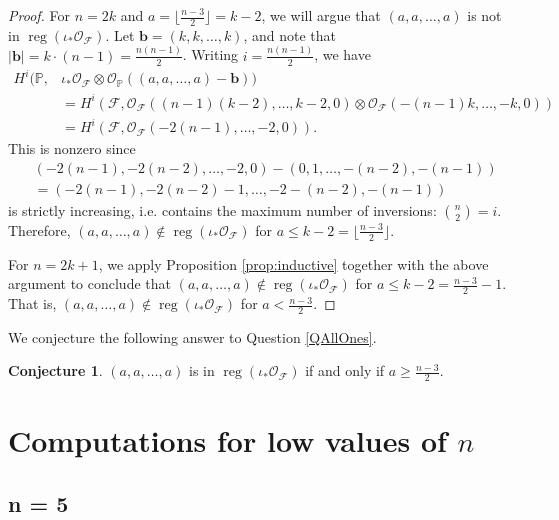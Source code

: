 \documentclass[12pt,reqno]{amsart}
\theoremstyle{definition}
\newtheorem{conj}[theorem]{Conjecture}
\theoremstyle{remark}
\newcommand{\reg}{\operatorname{reg}}
\newcommand{\calF}{{\mathcal{F}}}
\newcommand{\calO}{{\mathcal{O}}}
\begin{document}
\begin{proof}
    For $n = 2k$ and $a = \lfloor\frac{n-3}{2}\rfloor  = k-2$, we will argue that $(a,a,\ldots,a)$ is not in $\reg(\iota_*\calO_{\calF})$.  Let $\mathbf{b} = (k,k,\ldots,k)$, and note that $\lvert\mathbf{b}\rvert = k\cdot (n-1) = \frac{n(n-1)}{2}$.  Writing $i = \frac{n(n-1)}{2}$, we have
    \begin{align*}
        H^i(\mathbb P,&\iota_*\calO_{\calF}\otimes \calO_{\mathbb P}((a,a,\ldots,a)-\mathbf b)) \\
        &= H^i(\calF,\calO_{\calF}((n-1)(k-2),\ldots,k-2,0)\otimes\calO_{\calF}(-(n-1)k,\ldots,-k,0))\\
        &= H^i(\calF,\calO_{\calF}(-2(n-1),\ldots,-2,0)).
    \end{align*}
    This is nonzero since
    \begin{align*}
        &(-2(n-1),-2(n-2),\ldots,-2,0) - (0,1,\ldots,-(n-2),-(n-1))\\
        &= (-2(n-1),-2(n-2)-1,\ldots,-2-(n-2),-(n-1))
    \end{align*}
    is strictly increasing, i.e. contains the maximum number of inversions: $\binom{n}{2} = i$.  Therefore, $(a,a,\ldots,a) \notin \reg(\iota_*\calO_{\calF})$ for $a \leq k-2 = \lfloor\frac{n-3}{2}\rfloor$.

    For $n = 2k+1$, we apply Proposition \ref{prop:inductive} together with the above argument to conclude that $(a,a,\ldots,a) \notin \reg(\iota_*\calO_{\calF})$ for $a \leq k-2 = \frac{n-3}{2} - 1$.  That is, $(a,a,\ldots,a) \notin \reg(\iota_*\calO_{\calF})$ for $a < \frac{n-3}{2}$.
\end{proof}

We conjecture the following answer to Question \ref{QAllOnes}.

\begin{conj}
    $(a,a,\ldots,a)$ is in $\reg(\iota_*\calO_{\calF})$ if and only if $a \geq \frac{n-3}{2}$.
\end{conj}






\appendix

\section{Computations for low values of $n$}

\subsection{n = 5}\label{app:n=5}
\end{document}
